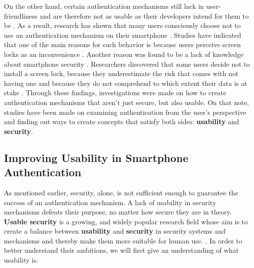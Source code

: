 On the other hand, certain authentication mechanisms still lack in user-friendliness and are therefore not as usable as their developers intend for them to be \cite{Schloeglhofer}. As a result, research has shown that many users consciously choose not to use an authentication mechanism on their smartphone \cite{ediss20251, Albayram:2017:BUL:3235924.3235929, Egelman:2014:YRL:2660267.2660273}. Studies have indicated that one of the main reasons for such behavior is because users perceive screen locks as an inconvenience \cite{Albayram:2017:BUL:3235924.3235929, ediss20251, harbach}. Another reason was found to be a lack of knowledge about smartphone security \cite{Albayram:2017:BUL:3235924.3235929, Adams:1999:UE:322796.322806}. Researchers discovered that some users decide not to install a screen lock, because they underestimate the risk that comes with not having one and because they do not comprehend to which extent their data is at stake \cite{Egelman:2014:YRL:2660267.2660273}. Through these findings, investigations were made on how to create authentication mechanisms that aren't just secure, but also usable. On that note, studies have been made on examining authentication from the user's perspective and finding out ways to create concepts that satisfy both sides: \textbf{usability} and \textbf{security}.  


\subsection{Improving Usability in Smartphone Authentication}

As mentioned earlier, security, alone, is not sufficient enough to guarantee the success of an authentication mechanism. A lack of usability in security mechanisms defeats their purpose, no matter how secure they are in theory. \textbf{Usable security} is a growing, and widely popular research field whose aim is to create a balance between \textbf{usability} and \textbf{security} in security systems and mechanisms and thereby make them more suitable for human use. \cite{Realpe-Munoz, anonymous}. In order to better understand their ambitions, we will first give an understanding of what usability is. \\

